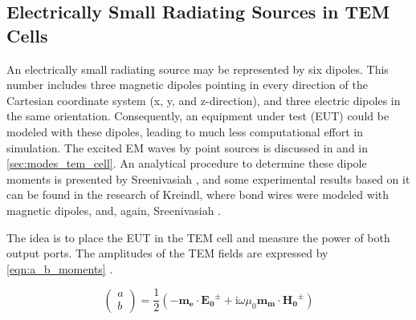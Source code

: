 \subsection{Electrically Small Radiating Sources in TEM Cells}


An electrically small radiating source may be represented by six dipoles. This number includes three magnetic dipoles pointing in every direction of the Cartesian coordinate system (x, y, and z-direction), and three electric dipoles in the same orientation. Consequently, an equipment under test (EUT) could be modeled with these dipoles, leading to much less computational effort in simulation. The excited EM waves by point sources is discussed in \cite{Collin_2015} and in \autoref{sec:modes_tem_cell}. An analytical procedure to determine these dipole moments is presented by Sreenivasiah \cite{Sreenivasiah_Chang_Ma_1981}, and some experimental results based on it can be found in the research of Kreindl, where bond wires were modeled with magnetic dipoles\cite{Kreindl_Bauernfeind_Weiss_Stockreiter_Kaltenbacher_2024}, and, again, Sreenivasiah \cite{Sreenivasiah_Chang_Ma_1981}.


The idea is to place the EUT in the TEM cell and measure the power of both output ports. The amplitudes of the TEM fields are expressed by \autoref{eqn:a_b_moments} \cite{Sreenivasiah_Chang_Ma_1981}. %

\begin{equation}
    \begin{pmatrix}a \\b\end{pmatrix} = \frac{1}{2}(-\mathbf{m_e}\cdot \mathbf{E_0}^\pm+\mathrm{i}\omega\mu_0\mathbf{m_m}\cdot\mathbf{H_0}^\pm)
    \label{eqn:a_b_moments}
\end{equation}

